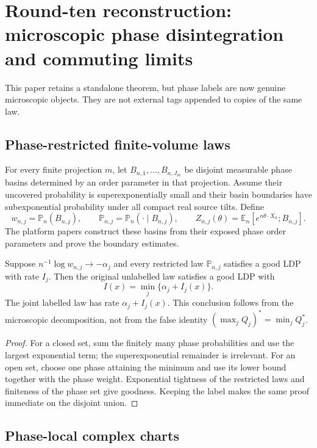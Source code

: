 \section{Round-ten reconstruction: microscopic phase disintegration and commuting limits}
\label{sec:r10-d1}

This paper retains a standalone theorem, but phase labels are now genuine
microscopic objects.  They are not external tags appended to copies of the
same law.

\subsection{Phase-restricted finite-volume laws}

For every finite projection \(m\), let
\(B_{n,1},\ldots,B_{n,J_m}\) be disjoint measurable phase basins determined by
an order parameter in that projection.  Assume their uncovered probability is
superexponentially small and their basin boundaries have subexponential
probability under all compact real source tilts.  Define
\[
 w_{n,j}=\mathbb P_n(B_{n,j}),
 \qquad
 \mathbb P_{n,j}=\mathbb P_n(\cdot\mid B_{n,j}),
 \qquad
 Z_{n,j}(\theta)=
 \mathbb E_n[e^{n\theta\cdot X_n};B_{n,j}].
\]
The platform papers construct these basins from their exposed phase order
parameters and prove the boundary estimates.

\begin{theorem}
\label{thm:r10-d1-mixture}
Suppose \(n^{-1}\log w_{n,j}\to-\alpha_j\) and every restricted law
\(\mathbb P_{n,j}\) satisfies a good LDP with rate \(I_j\).  Then the original
unlabelled law satisfies a good LDP with
\[
 I(x)=\min_j\{\alpha_j+I_j(x)\}.
\]
The joint labelled law has rate \(\alpha_j+I_j(x)\).  This conclusion follows
from the microscopic decomposition, not from the false identity
\((\max_jQ_j)^*=\min_jQ_j^*\).
\end{theorem}

\begin{proof}
For a closed set, sum the finitely many phase probabilities and use the
largest exponential term; the superexponential remainder is irrelevant.  For
an open set, choose one phase attaining the minimum and use its lower bound
together with the phase weight.  Exponential tightness of the restricted laws
and finiteness of the phase set give goodness.  Keeping the label makes the
same proof immediate on the disjoint union.
\end{proof}

\subsection{Phase-local complex charts}

